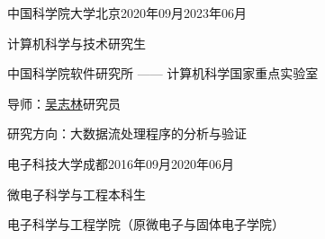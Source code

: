 
\begin{eduitem}{中国科学院大学}{北京}{2020年09月}{2023年06月}
    \item 计算机科学与技术研究生
    \item 中国科学院软件研究所 —— 计算机科学国家重点实验室
    \item 导师：\href{http://lcs.ios.ac.cn/~wuzl/}{吴志林}研究员
    \item 研究方向：大数据流处理程序的分析与验证
\end{eduitem}

\begin{eduitem}{电子科技大学}{成都}{2016年09月}{2020年06月}
\item 微电子科学与工程本科生
\item 电子科学与工程学院（原微电子与固体电子学院）
\end{eduitem}



\endinput